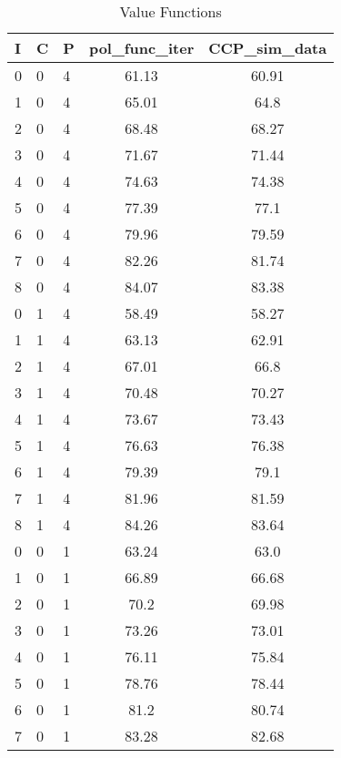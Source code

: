 \begin{table}[!htbp]
  \centering
  \caption{Value Functions}
\begin{tabular}{@{}lllcc@{}}
\toprule
I & C & P & pol\_func\_iter & CCP\_sim\_data \\ \midrule
0 & 0 & 4 & 61.13           & 60.91           \\
1 & 0 & 4 & 65.01           & 64.8            \\
2 & 0 & 4 & 68.48           & 68.27           \\
3 & 0 & 4 & 71.67           & 71.44           \\
4 & 0 & 4 & 74.63           & 74.38           \\
5 & 0 & 4 & 77.39           & 77.1            \\
6 & 0 & 4 & 79.96           & 79.59           \\
7 & 0 & 4 & 82.26           & 81.74           \\
8 & 0 & 4 & 84.07           & 83.38           \\
0 & 1 & 4 & 58.49           & 58.27           \\
1 & 1 & 4 & 63.13           & 62.91           \\
2 & 1 & 4 & 67.01           & 66.8            \\
3 & 1 & 4 & 70.48           & 70.27           \\
4 & 1 & 4 & 73.67           & 73.43           \\
5 & 1 & 4 & 76.63           & 76.38           \\
6 & 1 & 4 & 79.39           & 79.1            \\
7 & 1 & 4 & 81.96           & 81.59           \\
8 & 1 & 4 & 84.26           & 83.64           \\
0 & 0 & 1 & 63.24           & 63.0            \\
1 & 0 & 1 & 66.89           & 66.68           \\
2 & 0 & 1 & 70.2            & 69.98           \\
3 & 0 & 1 & 73.26           & 73.01           \\
4 & 0 & 1 & 76.11           & 75.84           \\
5 & 0 & 1 & 78.76           & 78.44           \\
6 & 0 & 1 & 81.2            & 80.74           \\
7 & 0 & 1 & 83.28           & 82.68           \\

\end{tabular}
\end{table}
